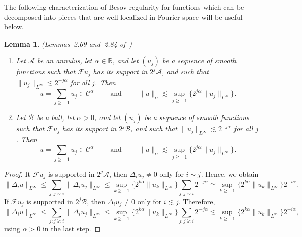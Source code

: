 \documentclass[a4paper,11pt]{article}
\newcommand{\tmop}[1]{\ensuremath{\operatorname{#1}}}
\newenvironment{enumeratenumeric}{\begin{enumerate}[1.] }{\end{enumerate}}
\newtheorem{lemma}[theorem]{Lemma}
\theoremstyle{remark}
\newcommand{\CA}{\ensuremath{\mathscr{A}}}
\newcommand{\CB}{\ensuremath{\mathscr{B}}}
\newcommand{\CC}{\ensuremath{\mathscr{C}}}
\newcommand{\CF}{\ensuremath{\mathscr{F}}}
\begin{document}
The following characterization of Besov regularity for functions which can be decomposed into pieces that are well localized in Fourier space will be useful below.

\begin{lemma}\label{lem: Besov regularity of series}(Lemmas~2.69 and~2.84 of~{\cite{Bahouri2011}})
   \begin{enumeratenumeric}
      \item Let $\CA$ be an annulus, let $\alpha \in \mathbb{R}$, and let $(u_{j})$ be a sequence of smooth functions such that $\CF u_{j}$ has its support in $2^{j} \CA$, and such that $\| u_{j} \|_{L^{\infty}} \lesssim 2^{-j \alpha}$ for all $j$. Then
         \[
            u= \sum_{j \geqslant -1} u_{j} \in \CC^{\alpha} \qquad  \tmop{and} \qquad \| u \|_{\alpha} \lesssim \sup_{j \geqslant -1} \{ 2^{j \alpha} \| u_{j} \|_{L^{\infty}} \} .
         \]
      \item Let $\CB$ be a ball, let $\alpha >0$, and let $( u_{j} )$ be a sequence of smooth functions such that $\CF u_{j}$ has its support in $2^{j} \CB$, and such that $\| u_{j} \|_{L^{\infty}} \lesssim 2^{-j \alpha}$ for all $j$. Then
         \[
            u= \sum_{j \geqslant -1} u_{j} \in \CC^{\alpha} \qquad \tmop{and} \qquad \| u \|_{\alpha} \lesssim \sup_{j \geqslant -1} \{ 2^{j \alpha} \| u_{j} \|_{L^{\infty}} \} .
         \]
   \end{enumeratenumeric}
\end{lemma}

\begin{proof}
  It $\CF u_{j}$ is supported in $2^{j} \CA$, then $\Delta_{i} u_{j} \neq 0$ only for $i \sim j$. Hence, we obtain
  \[
     \| \Delta_{i} u \|_{L^{\infty}} \leqslant \sum_{j:j \sim i} \| \Delta_{i} u_{j} \|_{L^{\infty}} \leqslant \sup_{k \geqslant -1} \{ 2^{k \alpha} \| u_{k} \|_{L^{\infty}} \} \sum_{j:j \sim i} 2^{-j  \alpha} \simeq \sup_{k \geqslant -1} \{ 2^{k \alpha} \| u_{k} \|_{L^{\infty}} \} 2^{-i \alpha}.
  \]
  If $\CF u_{j}$ is supported in $2^{j} \CB$, then $\Delta_{i} u_{j} \neq 0$ only for $i \lesssim j$. Therefore,
   \[
      \| \Delta_{i} u \|_{L^{\infty}} \leqslant \sum_{j:j \gtrsim i} \| \Delta_{i} u_{j} \|_{L^{\infty}} \leqslant \sup_{k \geqslant -1} \{ 2^{k \alpha} \| u_{k} \|_{L^{\infty}} \} \sum_{j:j \gtrsim i} 2^{-j  \alpha}  \lesssim \sup_{k \geqslant -1} \{ 2^{k \alpha} \| u_{k} \|_{L^{\infty}} \} 2^{-i \alpha},
   \]
   using $\alpha >0$ in the last step.
\end{proof}
\end{document}

